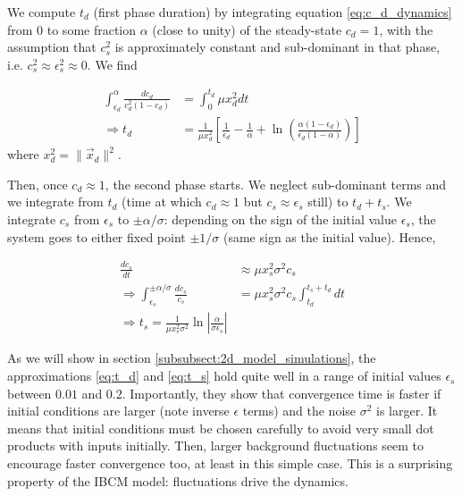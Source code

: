 We compute $t_d$ (first phase duration) by integrating equation \eqref{eq:c_d_dynamics} from 0 to some fraction $\alpha$ (close to unity) of the steady-state $c_d = 1$, with the assumption that $c_s^2$ is approximately constant and sub-dominant in that phase, i.e. $c_s^2 \approx \epsilon_s^2 \approx 0$. We find

\begin{align}
	\int_{\epsilon_d}^\alpha \frac{d c_d}{c_d^2(1 - c_d)} &= \int_0^{t_d} \mu x_d^2 dt  \nonumber \\
	\Rightarrow t_d &= \frac{1}{\mu x_d^2} \left[\frac{1}{\epsilon_d} - \frac{1}{\alpha} + \ln \left(\frac{\alpha(1 - \epsilon_d)}{\epsilon_d(1 - \alpha)}  \right)  \right]
	\label{eq:t_d}
\end{align}
where $x_d^2 = \| \vec{x}_d \|^2$. 

Then, once $c_d \approx 1$, the second phase starts. We neglect sub-dominant terms and we integrate from $t_d$ (time at which $c_d \approx 1$ but $c_s \approx \epsilon_s$ still) to $t_d + t_s$. We integrate $c_s$ from $\epsilon_s$ to $\pm \alpha / \sigma$:  depending on the sign of the initial value $\epsilon_s$, the system goes to either fixed point $\pm 1 / \sigma$ (same sign as the initial value). Hence, 

\begin{align}
	\frac{d c_s}{dt} &\approx \mu x_s^2 \sigma^2 c_s   \nonumber  \\
	\Rightarrow \int_{\epsilon_s}^{\pm\alpha/\sigma} \frac{d c_s}{c_s}	&= \mu x_s^2 \sigma^2 c_s \int_{t_d}^{t_s + t_d} dt  \nonumber \\
	\Rightarrow t_s = \frac{1}{\mu x_s^2 \sigma^2} \ln{\left|\frac{\alpha}{\sigma \epsilon_s}  \right|}
	\label{eq:t_s}
\end{align}

As we will show in section \ref{subsubsect:2d_model_simulations}, the approximations \eqref{eq:t_d} and \eqref{eq:t_s} hold quite well in a range of initial values $\epsilon_s$ between $0.01$ and $0.2$. Importantly, they show that convergence time is faster if initial conditions are larger (note inverse $\epsilon$ terms) and the noise $\sigma^2$ is larger. It means that initial conditions must be chosen carefully to avoid very small dot products with inputs initially. Then, larger background fluctuations seem to encourage faster convergence too, at least in this simple case. This is a surprising property of the IBCM model: fluctuations drive the dynamics. 




